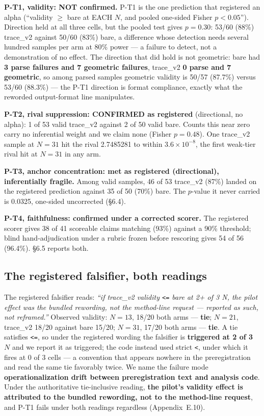 \textbf{P-T1, validity: NOT confirmed.} P-T1 is the one prediction that registered an alpha
(``validity $\ge$ bare at EACH $N$, and pooled one-sided Fisher $p < 0.05$''). Direction held at all
three cells, but the pooled test gives $p = 0.30$: 53/60 (88\%) trace\_v2 against 50/60 (83\%) bare,
a difference whose detection needs several hundred samples per arm at 80\% power --- a failure to
detect, not a demonstration of no effect. The direction that did hold is not geometric: bare had
\textbf{3 parse failures and 7 geometric failures}, trace\_v2 \textbf{0 parse and 7 geometric}, so
among parsed samples geometric validity is 50/57 (87.7\%) versus 53/60 (88.3\%) --- the P-T1
direction is format compliance, exactly what the reworded output-format line manipulates.

\textbf{P-T2, rival suppression: CONFIRMED as registered} (directional, no alpha): 1 of 53 valid
trace\_v2 against 2 of 50 valid bare. Counts this near zero carry no inferential weight and we
claim none (Fisher $p = 0.48$). One trace\_v2 sample at $N = 31$ hit the rival 2.7485281 to within
$3.6\times10^{-8}$, the first weak-tier rival hit at $N = 31$ in any arm.

\textbf{P-T3, anchor concentration: met as registered (directional), inferentially fragile.} Among
valid samples, 46 of 53 trace\_v2 (87\%) landed on the registered prediction against 35 of 50 (70\%)
bare. The $p$-value it never carried is 0.0325, one-sided uncorrected (\S6.4).

\textbf{P-T4, faithfulness: confirmed under a corrected scorer.} The registered scorer gives 38 of
41 scoreable claims matching (93\%) against a 90\% threshold; blind hand-adjudication under a rubric
frozen before rescoring gives 54 of 56 (96.4\%). \S6.5 reports both.

\subsection{The registered falsifier, both readings}

The registered falsifier reads: \emph{``if trace\_v2 validity \texttt{<=} bare at 2+ of 3 N, the
pilot effect was the bundled rewording, not the method-line request --- reported as such, not
reframed.''} Observed validity: $N = 13$, 18/20 both arms --- \textbf{tie}; $N = 21$, trace\_v2
18/20 against bare 15/20; $N = 31$, 17/20 both arms --- \textbf{tie}. A tie satisfies \texttt{<=},
so under the registered wording the falsifier is \textbf{triggered at 2 of 3 $N$} and we report it
as triggered; the code instead used strict \texttt{<}, under which it fires at 0 of 3 cells --- a
convention that appears nowhere in the preregistration and read the same tie favorably twice. We
name the failure mode \textbf{operationalization drift between preregistration text and analysis
code}. Under the authoritative tie-inclusive reading, \textbf{the pilot's validity effect is
attributed to the bundled rewording, not to the method-line request}, and P-T1 fails under both
readings regardless (Appendix~E.10).

